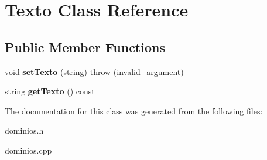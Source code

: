 \hypertarget{classTexto}{}\section{Texto Class Reference}
\label{classTexto}
\subsection*{Public Member Functions}
\begin{DoxyCompactItemize}
\item 
\mbox{\label{classTexto_a2757e0409bd76bb77c8eb6ecb09cc69d}} 
void {\bfseries set\+Texto} (string)  throw (invalid\+\_\+argument)
\item 
\mbox{\label{classTexto_a69463b543f36eaf86076ef48c896987f}} 
string {\bfseries get\+Texto} () const
\end{DoxyCompactItemize}


The documentation for this class was generated from the following files\+:\begin{DoxyCompactItemize}
\item 
dominios.\+h\item 
dominios.\+cpp\end{DoxyCompactItemize}
